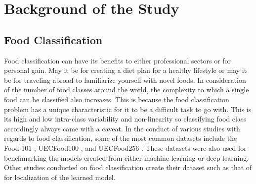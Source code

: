 \section{Background of the Study}
\subsection{Food Classification}
Food classification can have its benefits to either professional sectors or for personal gain. May it be for creating a diet plan for a healthy lifestyle or may it be for traveling abroad to familiarize yourself with novel foods. In consideration of the number of food classes around the world, the complexity to which a single food can be classified also increases. This is because the food classification problem has a unique characteristic for it to be a difficult task to go with. This is its high and low intra-class variability \cite{ciocca-2019} and non-linearity \cite{islam-2018} so classifying food class accordingly always came with a caveat. In the conduct of various studies with regards to food classification, some of the most common datasets include the Food-101 \cite{bossard-2014}, UECFood100 \cite{matsuda-2012}, and UECFood256 \cite{kawano-2014,kawano-2015}. These datasets were also used for benchmarking the models created from either machine learning or deep learning. Other studies conducted on food classification create their dataset such as that of \cite{pandey-2017} for localization of the learned model.
